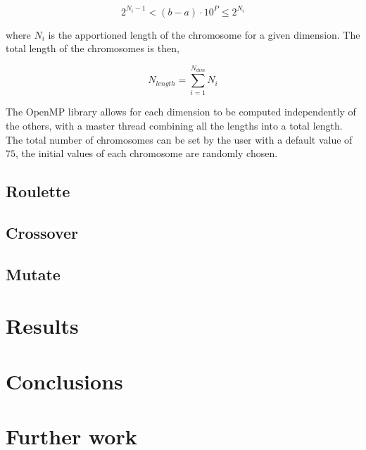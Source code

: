 \documentclass[aps,prl,preprint,groupedaddress,showkeys, nobibnotes]{revtex4-1}
\begin{document}
\begin{equation}
2^{N_{i}-1}<(b-a)\cdot10^{P}\leq2^{N_{i}}
\end{equation}

where $N_{i}$ is the apportioned length of the chromosome for a given dimension.  The total length of the chromosomes is then,

\begin{equation}
N_{length } = \sum\limits_{i=1}^{N_{dim}} N_{i}
\end{equation}

The OpenMP library allows for each dimension to be computed independently of the others, with a master thread combining all the lengths into a total length.  The total number of chromosomes can be set by the user with a default value of $75$, the initial values of each chromosome are randomly chosen.

\subsection{Roulette}
\subsection{Crossover}
\subsection{Mutate}

\section{Results}
\section{Conclusions}
\section{Further work}

%
\end{document}

